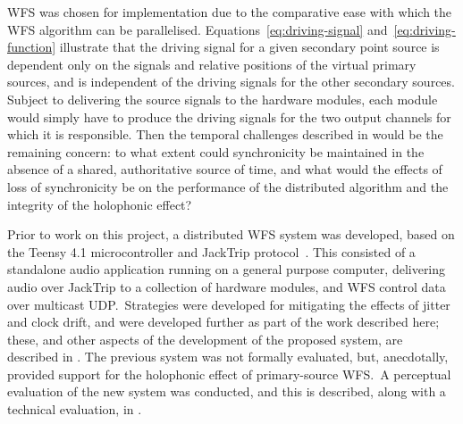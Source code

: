 WFS was chosen for implementation due to the comparative ease with which the WFS
algorithm can be parallelised.
Equations~\eqref{eq:driving-signal} and~\eqref{eq:driving-function} illustrate
that the driving signal for a given secondary point source is dependent only
on the signals and relative positions of the virtual primary sources, and is
independent of the driving signals for the other secondary sources.
Subject to delivering the source signals to the hardware modules, each module
would simply have to produce the driving signals for the two output channels
for which it is responsible.
Then the temporal challenges described in  would
be the remaining concern: to what extent could synchronicity be maintained
in the absence of a shared, authoritative source of time, and what would the
effects of loss of synchronicity be on the performance of the distributed
algorithm and the integrity of the holophonic effect?

Prior to work on this project, a distributed WFS system was developed, based on
the Teensy 4.1 microcontroller and JackTrip
protocol~\citep{rushton_microcontroller-based_2023}.
This consisted of a standalone audio application running on a general purpose
computer, delivering audio over JackTrip to a collection of hardware modules,
and WFS control data over multicast UDP.\
Strategies were developed for mitigating the effects of jitter and clock drift,
and were developed further as part of the work described here;
these, and other aspects of the development of the proposed system, are
described in \secref{sec:method}.
The previous system was not formally evaluated, but, anecdotally, provided
support for the holophonic effect of primary-source WFS.\
A perceptual evaluation of the new system was conducted, and this is described,
along with a technical evaluation, in \secref{sec:results}.
